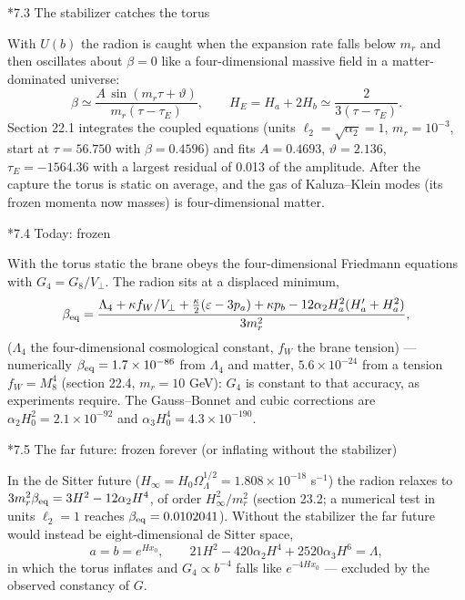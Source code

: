\documentclass[10pt,a4paper]{article}
\makeatletter
\renewcommand\subsection{\@startsection{subsection}{2}{\z@}{-3.25ex\@plus -1ex \@minus -.2ex}{1.5ex \@plus .2ex}{\normalfont\large\bfseries\raggedright}}
\makeatother
\begin{document}
\subsection*{7.3 The stabilizer catches the torus}
With $U(b)$ the radion is caught when the expansion rate falls below $m_r$ and then oscillates about $\beta=0$ like a four-dimensional massive field in a matter-dominated universe:
\begin{equation*}
\beta\simeq\frac{A\,\sin(m_r\tau+\vartheta)}{m_r(\tau-\tau_E)},\qquad H_E=H_a+2H_b\simeq\frac2{3(\tau-\tau_E)} .
\end{equation*}
Section 22.1 integrates the coupled equations (units $\ell_2=\sqrt{\alpha_2}=1$, $m_r=10^{-3}$, start at $\tau=56.750$ with $\beta=0.4596$) and fits $A=0.4693$, $\vartheta=2.136$, $\tau_E=-1564.36$ with a largest residual of 0.013 of the amplitude. After the capture the torus is static on average, and the gas of Kaluza–Klein modes (its frozen momenta now masses) is four-dimensional matter.

\subsection*{7.4 Today: frozen}
With the torus static the brane obeys the four-dimensional Friedmann equations with $G_4=G_8/V_\perp$. The radion sits at a displaced minimum,
\begin{equation*}
\beta_{\rm eq}=\frac{\Lambda_4+\kappa f_W/V_\perp+\frac\kappa2(\varepsilon-3p_a)+\kappa p_b-12\alpha_2H_a^2(H_a'+H_a^2)}{3m_r^2},
\end{equation*}
($\Lambda_4$ the four-dimensional cosmological constant, $f_W$ the brane tension) — numerically $\beta_{\rm eq}=1.7\times10^{-86}$ from $\Lambda_4$ and matter, $5.6\times10^{-24}$ from a tension $f_W=M_8^4$ (section 22.4, $m_r=10$ GeV): $G_4$ is constant to that accuracy, as experiments require. The Gauss–Bonnet and cubic corrections are $\alpha_2H_0^2=2.1\times10^{-92}$ and $\alpha_3H_0^4=4.3\times10^{-190}$.

\subsection*{7.5 The far future: frozen forever (or inflating without the stabilizer)}
In the de Sitter future ($H_\infty=H_0\Omega_\Lambda^{1/2}=1.808\times10^{-18}$ s$^{-1}$) the radion relaxes to $3m_r^2\beta_{\rm eq}=3H^2-12\alpha_2H^4$, of order $H_\infty^2/m_r^2$ (section 23.2; a numerical test in units $\ell_2=1$ reaches $\beta_{\rm eq}=0.0102041$). Without the stabilizer the far future would instead be eight-dimensional de Sitter space,
\begin{equation*}
a=b=e^{Hx_0},\qquad 21H^2-420\alpha_2H^4+2520\alpha_3H^6=\Lambda,
\end{equation*}
in which the torus inflates and $G_4\propto b^{-4}$ falls like $e^{-4Hx_0}$ — excluded by the observed constancy of $G$.
\end{document}
